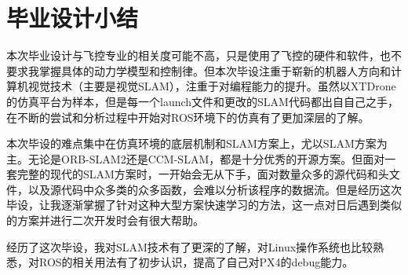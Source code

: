 
\chapter*{毕业设计小结}

本次毕业设计与飞控专业的相关度可能不高，只是使用了飞控的硬件和软件，也不要求我掌握具体的动力学模型和控制律。但本次毕设注重于崭新的机器人方向和计算机视觉技术（主要是视觉SLAM），注重于对编程能力的提升。虽然以XTDrone的仿真平台为样本，但是每一个launch文件和更改的SLAM代码都出自自己之手，在不断的尝试和分析过程中开始对ROS环境下的仿真有了更加深层的了解。

本次毕设的难点集中在仿真环境的底层机制和SLAM方案上，尤以SLAM方案为主。无论是ORB-SLAM2还是CCM-SLAM，都是十分优秀的开源方案。但面对一套完整的现代的SLAM方案时，一开始会无从下手，面对数量众多的源代码和头文件，以及源代码中众多类的众多函数，会难以分析该程序的数据流。但是经历这次毕设，让我逐渐掌握了针对这种大型方案快速学习的方法，这一点对日后遇到类似的方案并进行二次开发时会有很大帮助。

经历了这次毕设，我对SLAM技术有了更深的了解，对Linux操作系统也比较熟悉，对ROS的相关用法有了初步认识，提高了自己对PX4的debug能力。

